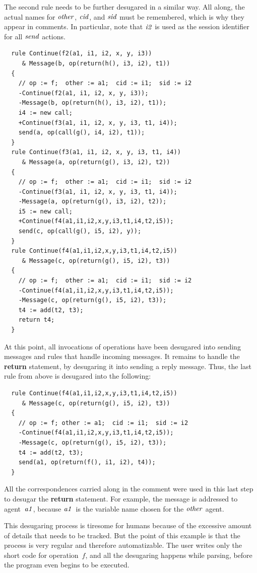 \documentclass[a4paper,12pt,oneside,fleqn]{book} %
\begin{document}
{\begin{example}
The second rule needs to be further desugared in a similar way. All along,
the actual names for $\it other$, $\it cid$, and $\it sid$ must be
remembered, which is why they appear in comments. In particular, note that
$\it i2$ is used as the session identifier for all $\it send$ actions.
\begin{verbatim}
  rule Continue(f2(a1, i1, i2, x, y, i3))
     & Message(b, op(return(h(), i3, i2), t1))
  {
    // op := f;  other := a1;  cid := i1;  sid := i2
    -Continue(f2(a1, i1, i2, x, y, i3));
    -Message(b, op(return(h(), i3, i2), t1));
    i4 := new call;
    +Continue(f3(a1, i1, i2, x, y, i3, t1, i4));
    send(a, op(call(g(), i4, i2), t1));
  }
  rule Continue(f3(a1, i1, i2, x, y, i3, t1, i4))
     & Message(a, op(return(g(), i3, i2), t2))
  {
    // op := f;  other := a1;  cid := i1;  sid := i2
    -Continue(f3(a1, i1, i2, x, y, i3, t1, i4));
    -Message(a, op(return(g(), i3, i2), t2));
    i5 := new call;
    +Continue(f4(a1,i1,i2,x,y,i3,t1,i4,t2,i5));
    send(c, op(call(g(), i5, i2), y));
  }
  rule Continue(f4(a1,i1,i2,x,y,i3,t1,i4,t2,i5))
     & Message(c, op(return(g(), i5, i2), t3))
  {
    // op := f;  other := a1;  cid := i1;  sid := i2
    -Continue(f4(a1,i1,i2,x,y,i3,t1,i4,t2,i5));
    -Message(c, op(return(g(), i5, i2), t3));
    t4 := add(t2, t3);
    return t4;
  }
\end{verbatim}
At this point, all invocations of operations have been desugared into
sending messages and rules that handle incoming messages. It remains to
handle the {\bf return} statement, by desugaring it into sending a reply
message. Thus, the last rule from above is desugared into the following:
\begin{verbatim}
  rule Continue(f4(a1,i1,i2,x,y,i3,t1,i4,t2,i5))
     & Message(c, op(return(g(), i5, i2), t3))
  {
    // op := f; other := a1;  cid := i1;  sid := i2
    -Continue(f4(a1,i1,i2,x,y,i3,t1,i4,t2,i5));
    -Message(c, op(return(g(), i5, i2), t3));
    t4 := add(t2, t3);
    send(a1, op(return(f(), i1, i2), t4));
  }
\end{verbatim}
All the correspondences carried along in the comment were used in this last
step to desugar the {\bf return} statement. For example, the message is
addressed to agent~$\it a1$, because $\it a1$~is the variable name chosen
for the $\it other$ agent.

This desugaring process is tiresome for humans because of the excessive
amount of details that needs to be tracked. But the point of this example
is that the process is very regular and therefore automatizable. The user
writes only the short code for operation~$f$, and all the desugaring
happens while parsing, before the program even begins to be executed.
\end{example}

}
\end{document}
